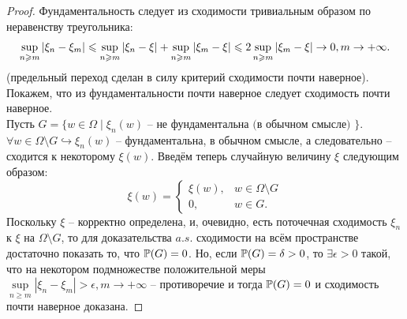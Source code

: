 \begin{proof}
    Фундаментальность следует из сходимости тривиальным образом по неравенству треугольника:
    \[
        \sup\limits_{n \geq m}|\xi_n - \xi_m| \leq  \sup\limits_{n \geq m} |\xi_n - \xi| + \sup\limits_{n \geq m} |\xi_m - \xi| \leq 2\sup\limits_{n \geq m}|\xi_m - \xi| \ra 0, m \ra +\infty.
    \]
    (предельный переход сделан в силу критерий сходимости почти наверное).
    Покажем, что из фундаментальности почти наверное следует сходимость почти наверное. \\
    Пусть $G = \{w \in \Omega \mid \xi_{n}(w) \text{ -- не фундаментальна (в обычном смысле) }\}$.
    $\forall w \in \Omega \setminus G \hookrightarrow \xi_n(w)$ -- фундаментальна, в обычном смысле, а следовательно -- сходится к некоторому $\xi(w)$.
    Введём теперь случайную величину $\xi$ следующим образом:
    \[
        \xi(w) =
        \begin{cases}
            \xi(w), & w \in \Omega \setminus G \\
            0, & w \in G.
        \end{cases}
    \]
    Поскольку $\xi$ -- корректно определена, и, очевидно, есть поточечная сходимость $\xi_n$ к $\xi$ на $\Omega \setminus G$, то для доказательства $a.s.$ сходимости на всём пространстве достаточно показать то, что $\P(G) = 0$.
    Но, если $\P(G) = \delta > 0$, то $\exists \epsilon > 0$ такой, что на некотором подмножестве положительной меры $\sup\limits_{n \geq m}|\xi_n - \xi_m| > \epsilon, m \rightarrow +\infty$ -- противоречие и тогда $\P(G) = 0$ и сходимость почти наверное доказана.
\end{proof}
